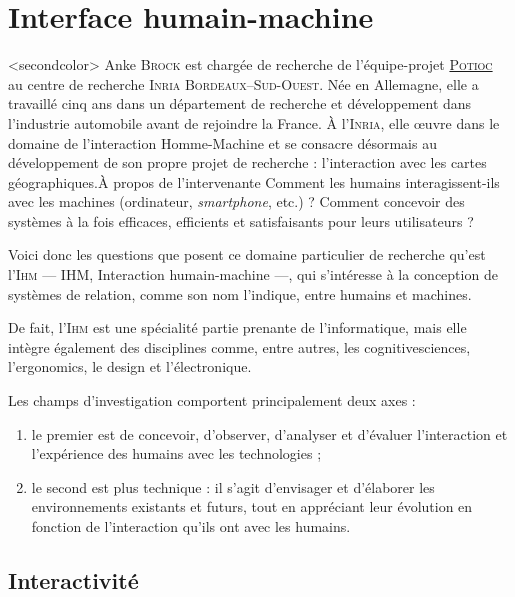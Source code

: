 \section[Interface humain-machine]{Interface humain-machine}
\label{sec:I.3}

\vspace*{-2pt}
\caution[t]<secondcolor>{%
Anke \textsc{Brock} est chargée de recherche de l'équipe-projet \href{https://team.inria.fr/potioc/fr/}{\textsc{Potioc}} au centre de recherche \textsc{Inria} \textsc{Bordeaux--Sud-Ouest}. Née en Allemagne, elle a travaillé cinq ans dans un département de recherche et développement dans l'industrie automobile avant de rejoindre la France. À l'\textsc{Inria}, elle œuvre dans le domaine de l'interaction Homme-Machine et se consacre désormais au développement de son propre projet de recherche : l'interaction avec les cartes géographiques.}{À propos de l'intervenante}
Comment les humains interagissent-ils avec les machines (ordinateur, \textit{smartphone}, etc.) ? Comment concevoir des systèmes à la fois efficaces, efficients et satisfaisants pour leurs utilisateurs ? 

Voici donc les questions que posent ce domaine particulier de recherche qu'est l'\textsc{Ihm} --- \gls{IHM}, Interaction humain-machine ---, qui s'intéresse à la conception de systèmes de relation, comme son nom l'indique, entre humains et machines.

De fait, l'\textsc{Ihm} est une spécialité partie prenante de l'informatique, mais elle intègre également des disciplines comme, entre autres, les \gls{cognitivesciences}, l'\gls{ergonomics}, le \gls{design} et l'électronique. 

Les champs d'investigation comportent principalement deux axes :
\begin{enumerate}
\item le premier est de concevoir, d'observer, d'analyser et d'évaluer l'interaction et l'expérience des humains avec les technologies ;
\item le second est plus technique : il s'agit d'envisager et d'élaborer les environnements existants et futurs, tout en appréciant leur évolution en fonction de l'interaction qu'ils ont avec les humains. 
\end{enumerate}

\vspace*{-2pt}
\subsection[Interactivité]{Interactivité}
\label{sub:I.3.1}

